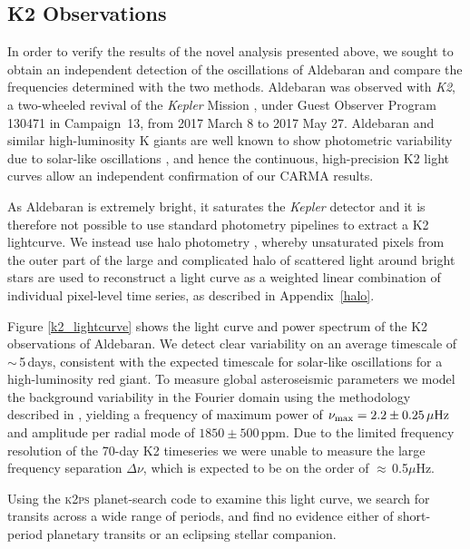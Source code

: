 \documentclass[modern]{aastex61}
\newcommand{\numax}{\mbox{$\nu_{\rm max}$}\xspace}
\newcommand{\Dnu}{\mbox{$\Delta \nu$}\xspace}
\newcommand{\muHz}{\mbox{$\mu$Hz}\xspace}
\newcommand{\kepler}{\emph{Kepler}\xspace}
\newcommand{\ktwo}{\emph{K2}\xspace}
\begin{document}
\subsection{K2 Observations}

In order to verify the results of the novel analysis presented above, we sought to obtain an independent detection of the oscillations of Aldebaran and compare the frequencies determined with the two methods.
Aldebaran was observed with \ktwo \citep{howell14}, a two-wheeled revival of the \kepler Mission \citep{2010sci...327..977b}, under Guest Observer Program 130471 in Campaign~13, from 2017 March 8 to 2017 May 27. Aldebaran and similar high-luminosity K giants are well known to show photometric variability due to solar-like oscillations \citep{bedding2000}, and hence the continuous, high-precision K2 light curves allow an independent confirmation of our CARMA results.

As Aldebaran is extremely bright, it saturates the \kepler detector and it is therefore not possible to use standard photometry pipelines to extract a K2 lightcurve. We instead use halo photometry \citep{White2017}, whereby unsaturated pixels from the outer part of the large and complicated halo of scattered light around bright stars are used to reconstruct a light curve as a weighted linear combination of individual pixel-level time series, as described in Appendix~\ref{halo}.

Figure \ref{k2_lightcurve} shows the light curve and power spectrum of the K2 observations of Aldebaran. We detect clear variability on an average timescale of $\sim$\,5\,days, consistent with the expected timescale for solar-like oscillations for a high-luminosity red giant. To measure global asteroseismic parameters we model the background variability in the Fourier domain using the methodology described in \citet{huber09}, yielding a frequency of maximum power of $\numax = 2.2 \pm 0.25\,\muHz$ and amplitude per radial mode of $1850 \pm 500$\,ppm. Due to the limited frequency resolution of the 70-day K2 timeseries we were unable to measure the large frequency separation \Dnu, which is expected to be on the order of $\approx$\,0.5\muHz.

Using the \textsc{k2ps} planet-search code \citep{k2ps,Pope2016} to examine this light curve, we search for transits across a wide range of periods, and find no evidence either of short-period planetary transits or an eclipsing stellar companion.
\end{document}
